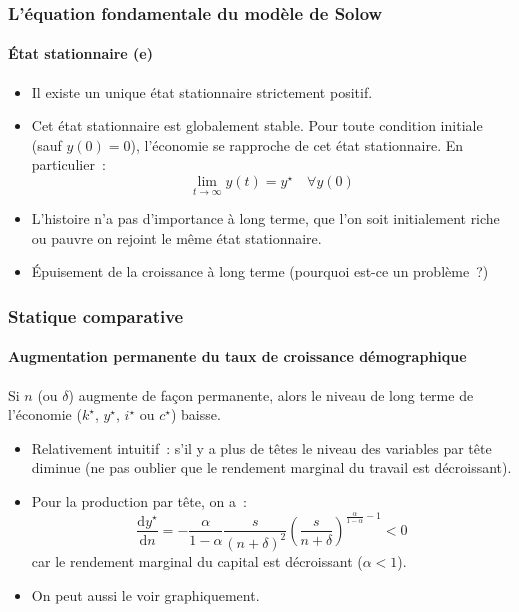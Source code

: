 \documentclass[10pt,notheorems]{beamer}
\theoremstyle{plain}
\theoremstyle{definition} %
\begin{document}
\begin{frame}
  \frametitle{L'équation fondamentale du modèle de Solow}
  \framesubtitle{État stationnaire (e)}

  \bigskip

  \begin{itemize}

  \item Il existe un unique état stationnaire strictement positif.\newline

  \item Cet état stationnaire est globalement stable. Pour toute
    condition initiale (sauf $y(0)=0$), l'économie se rapproche de cet
    état stationnaire. En particulier~:
    \[
      \lim_{t\rightarrow\infty} y(t) = y^{\star}\quad\forall y(0)
    \]

    \bigskip

  \item L'histoire n'a pas d'importance à long terme, que l'on soit
    initialement riche ou pauvre on rejoint le même état
    stationnaire.\newline

  \item Épuisement de la croissance  à long terme (pourquoi est-ce un problème~?)

  \end{itemize}
\end{frame}


\begin{frame}
  \frametitle{Statique comparative}
  \framesubtitle{Augmentation permanente du taux de croissance démographique}

  \bigskip

  \begin{block}{}
    Si $n$ (ou $\delta$) augmente de façon permanente, alors le niveau de long terme de l'économie ($k^{\star}$, $y^{\star}$, $i^{\star}$ ou $c^{\star}$) baisse.
  \end{block}

  \bigskip

  \begin{itemize}

  \item Relativement intuitif~: s'il y a plus de têtes le niveau des variables par tête diminue (ne pas oublier que le rendement marginal du travail est décroissant).\newline

  \item Pour la production par tête, on a~:
    \[
      \frac{\mathrm dy^{\star}}{\mathrm d n} = -\frac{\alpha}{1-\alpha}\frac{s}{(n+\delta)^2}\left(\frac{s}{n+\delta}\right)^{\frac{\alpha}{1-\alpha}-1}<0
    \]
    car le rendement marginal du capital est décroissant ($\alpha<1$).\newline

  \item On peut aussi le voir graphiquement.
  \end{itemize}

\end{frame}
\end{document}
